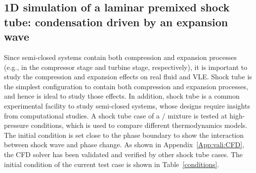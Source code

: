 
\subsection{1D simulation of a laminar premixed  shock tube: condensation driven by an expansion wave}
\label{sec:results:ShockTube}
Since semi-closed  systems contain both compression and expansion processes (e.g., in the compressor stage and turbine stage, respectively), it is important to study the compression and expansion effects on real fluid and VLE. Shock tube is the simplest configuration to contain both compression and expansion processes, and hence is ideal to study those effects. In addition,  shock tube is a common experimental facility to study semi-closed  systems, whose designs require insights from computational studies. 
A shock tube case of a / mixture is tested at high-pressure conditions,
which is used to compare different thermodynamics models. The initial condition is set close to the phase boundary to show the interaction between shock wave and phase change.  %
As shown in Appendix~\ref{App:vali:CFD}, the CFD solver has been validated and verified by other shock tube cases. The initial condition of the current test case is shown in Table~\ref{conditions}.
